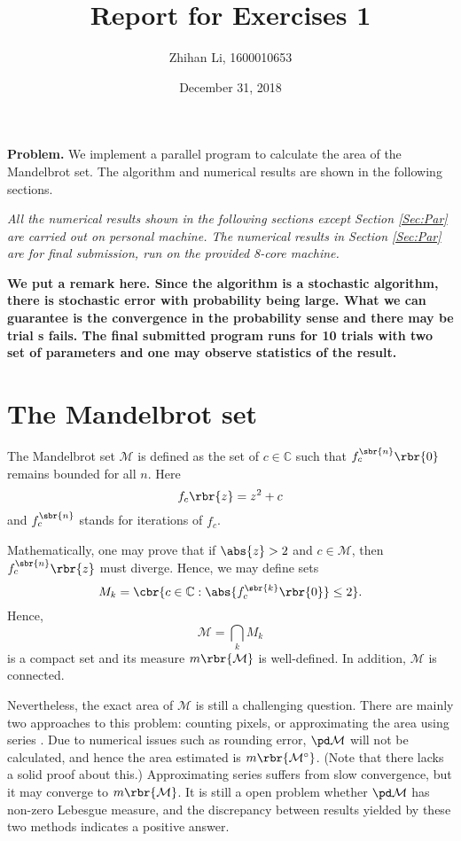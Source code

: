 \documentclass[english, nochinese]{pnote}
\title{Report for Exercises 1}
\author{Zhihan Li, 1600010653}
\date{December 31, 2018}
\begin{document}
\maketitle

\textbf{Problem.} We implement a parallel program to calculate the area of the Mandelbrot set. The algorithm and numerical results are shown in the following sections.

\emph{All the numerical results shown in the following sections except Section \ref{Sec:Par} are carried out on personal machine. The numerical results in Section \ref{Sec:Par} are for final submission, run on the provided 8-core machine.}

\textbf{We put a remark here. Since the algorithm is a stochastic algorithm, there is stochastic error with probability being large. What we can guarantee is the convergence in the probability sense and there may be trial s fails. The final submitted program runs for 10 trials with two set of parameters and one may observe statistics of the result.}

\section{The Mandelbrot set}

The Mandelbrot set $\mathcal{M}$ is defined as the set of $ c \in \mathbb{C} $ such that $ f_c^{\sbr{n}} \rbr{0} $ remains bounded for all $n$. Here
\begin{equation}
f_c \rbr{z} = z^2 + c
\end{equation}
and $f_c^{\sbr{n}}$ stands for iterations of $f_c$.

Mathematically, one may prove that if $ \abs{z} > 2 $ and $ c \in \mathcal{M} $, then $ f_c^{\sbr{n}} \rbr{z} $ must diverge. Hence, we may define sets
\begin{equation}
M_k = \cbr{ c \in \mathbb{C} : \abs{ f_c^{\sbr{k}} \rbr{0} } \le 2 }.
\end{equation}
Hence,
\begin{equation}
\mathcal{M} = \bigcap_k M_k
\end{equation}
is a compact set and its measure $ m \rbr{\mathcal{M}} $ is well-defined. In addition, $\mathcal{M}$ is connected.

Nevertheless, the exact area of $\mathcal{M}$ is still a challenging question. There are mainly two approaches to this problem: counting pixels, or approximating the area using series \parencite{ewing_area_1992}. Due to numerical issues such as rounding error, $ \pd \mathcal{M} $ will not be calculated, and hence the area estimated is $ m \rbr{\mathcal{M}^{\circ}} $. (Note that there lacks a solid proof about this.) Approximating series suffers from slow convergence, but it may converge to $ m \rbr{\mathcal{M}} $. It is still a open problem whether $ \pd \mathcal{M} $ has non-zero Lebesgue measure, and the discrepancy between results yielded by these two methods indicates a positive answer.
\end{document}
